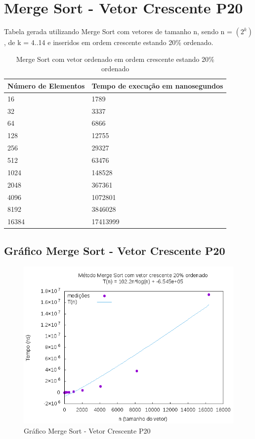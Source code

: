 \documentclass[12pt,a4paper,twoside]{report}
\begin{document}
\section{Merge Sort - Vetor Crescente P20}
Tabela gerada utilizando Merge Sort com vetores de tamanho n, sendo n = $(2^k)$, de k = 4..14 e inseridos em ordem crescente estando 20\% ordenado.
\begin{table}[H]
\centering
\caption{Merge Sort com vetor ordenado em ordem crescente estando 20\% ordenado}
\label{my-label}
\begin{tabular}{|l|l|}
\hline
\multicolumn{1}{|c|}{\textbf{Número de Elementos}} & \multicolumn{1}{c|}{\textbf{Tempo de execução em nanosegundos}} \\ \hline
16 & 1789 \\ \hline
32 & 3337 \\ \hline
64 & 6866 \\ \hline
128 & 12755 \\ \hline
256 & 29327 \\ \hline
512 & 63476 \\ \hline
1024 & 148528 \\ \hline
2048 & 367361 \\ \hline
4096 & 1072801 \\ \hline
8192 & 3846028 \\ \hline
16384 & 17413999 \\ \hline
\end{tabular}
\end{table}

\subsection{Gráfico Merge Sort - Vetor Crescente P20}
\begin{figure}[H]
    \centering
    \includegraphics[width=0.7\linewidth]{graficos/MergeSort/vIntCrescenteP20/vIntCrescenteP20.png}
  \caption{Gráfico Merge Sort - Vetor Crescente P20}
\end{figure}
\end{document}
